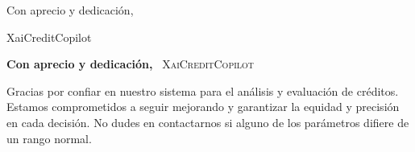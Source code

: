 \documentclass{article}
\begin{document}
Con aprecio y dedicación,

XaiCreditCopilot

\begin{center}
    \textbf{Con aprecio y dedicación,}\
    \vspace{0.5cm}
    \textsc{XaiCreditCopilot}\
    \vspace{0.2cm}
\end{center}

{\small
Gracias por confiar en nuestro sistema para el análisis y evaluación de créditos. Estamos comprometidos a seguir mejorando y garantizar la equidad y precisión en cada decisión. No dudes en contactarnos si alguno de los parámetros difiere de un rango normal.
}
\end{document}
